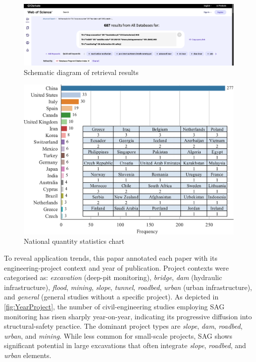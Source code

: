 \documentclass[preprint,11pt,authoryear,3p]{elsarticle}
\begin{document}
\begin{figure}[htbp]
    \centering
    \includegraphics[width=\textwidth]{imgs/advanceSearch.png}
    \caption{Schematic diagram of retrieval results}
    \label{fig:retrieval}
\end{figure}

\begin{figure}[h]
    \centering
    \includegraphics[width=\textwidth]{imgs/countries.pdf}
    \caption{National quantity statistics chart}
    \label{fig:NationalStatistcs}
\end{figure}

To reveal application trends, this papar annotated each paper with its engineering-project context and year of publication. Project contexts were categorised as: \emph{excavation} (deep-pit monitoring), \emph{bridge}, \emph{dam} (hydraulic infrastructure), \emph{flood}, \emph{mining}, \emph{slope}, \emph{tunnel}, \emph{roadbed}, \emph{urban} (urban infrastructure), and \emph{general} (general studies without a specific project). As depicted in \autoref{fig:YearProject}, the number of civil-engineering studies employing SAG monitoring has risen sharply year-on-year, indicating its progressive diffusion into structural-safety practice. The dominant project types are \emph{slope}, \emph{dam}, \emph{roadbed}, \emph{urban}, and \emph{mining}. While less common for small-scale projects, SAG shows significant potential in large excavations that often integrate \emph{slope}, \emph{roadbed}, and \emph{urban} elements.
\end{document}
